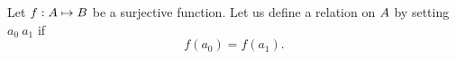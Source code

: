 \documentclass[../main.tex]{subfiles}
\begin{document}
\problem{}\label{s3p4}

Let \({f}: {{A}} \mapsto{} {{B}}\) be a surjective function. Let us
define a relation on \({A}\) by setting \({a_0}~{a_1}\) if
\[f({a_0}) = f({a_1}).\]



\end{document}
